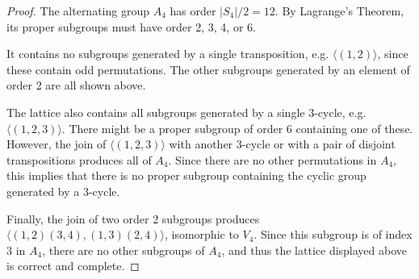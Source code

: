 \documentclass{article}
\begin{document}

\begin{proof}
    The alternating group $A_4$ has order $|S_4|/2 = 12$. By Lagrange's Theorem, its proper subgroups must have order 2, 3, 4, or 6.

    It contains no subgroups generated by a single transposition, e.g. $\langle (1, 2) \rangle$, since these contain odd permutations. The other subgroups generated by an element of order 2 are all shown above.

    The lattice also contains all subgroups generated by a single 3-cycle, e.g. $\langle (1, 2, 3) \rangle$. There might be a proper subgroup of order 6 containing one of these. However, the join of $\langle (1, 2, 3) \rangle$ with another 3-cycle or with a pair of disjoint transpositions produces all of $A_4$. Since there are no other permutations in $A_4$, this implies that there is no proper subgroup containing the cyclic group generated by a 3-cycle.

    Finally, the join of two order 2 subgroups produces $\langle (1, 2)(3, 4), (1, 3)(2, 4) \rangle$, isomorphic to $V_4$. Since this subgroup is of index 3 in $A_4$, there are no other subgroups of $A_4$, and thus the lattice displayed above is correct and complete.
\end{proof}
\end{document}
